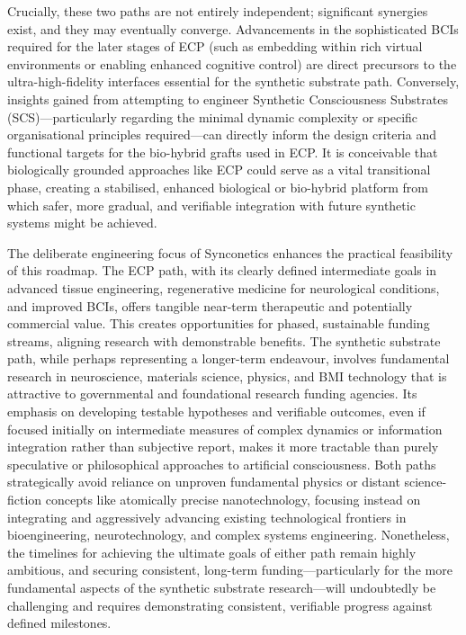 \documentclass[10pt]{article}
\begin{document}
\begin{sloppypar}
  Crucially, these two paths are not entirely independent; significant synergies exist, and they may eventually converge. Advancements in the sophisticated BCIs required for the later stages of ECP (such as embedding within rich virtual environments or enabling enhanced cognitive control) are direct precursors to the ultra-high-fidelity interfaces essential for the synthetic substrate path. Conversely, insights gained from attempting to engineer Synthetic Consciousness Substrates (SCS)—particularly regarding the minimal dynamic complexity or specific organisational principles required—can directly inform the design criteria and functional targets for the bio-hybrid grafts used in ECP. It is conceivable that biologically grounded approaches like ECP could serve as a vital transitional phase, creating a stabilised, enhanced biological or bio-hybrid platform from which safer, more gradual, and verifiable integration with future synthetic systems might be achieved.

  The deliberate engineering focus of Synconetics enhances the practical feasibility of this roadmap. The ECP path, with its clearly defined intermediate goals in advanced tissue engineering, regenerative medicine for neurological conditions, and improved BCIs, offers tangible near-term therapeutic and potentially commercial value. This creates opportunities for phased, sustainable funding streams, aligning research with demonstrable benefits. The synthetic substrate path, while perhaps representing a longer-term endeavour, involves fundamental research in neuroscience, materials science, physics, and BMI technology that is attractive to governmental and foundational research funding agencies. Its emphasis on developing testable hypotheses and verifiable outcomes, even if focused initially on intermediate measures of complex dynamics or information integration rather than subjective report, makes it more tractable than purely speculative or philosophical approaches to artificial consciousness. Both paths strategically avoid reliance on unproven fundamental physics or distant science-fiction concepts like atomically precise nanotechnology, focusing instead on integrating and aggressively advancing existing technological frontiers in bioengineering, neurotechnology, and complex systems engineering. Nonetheless, the timelines for achieving the ultimate goals of either path remain highly ambitious, and securing consistent, long-term funding—particularly for the more fundamental aspects of the synthetic substrate research—will undoubtedly be challenging and requires demonstrating consistent, verifiable progress against defined milestones.


\end{sloppypar}
\end{document}
